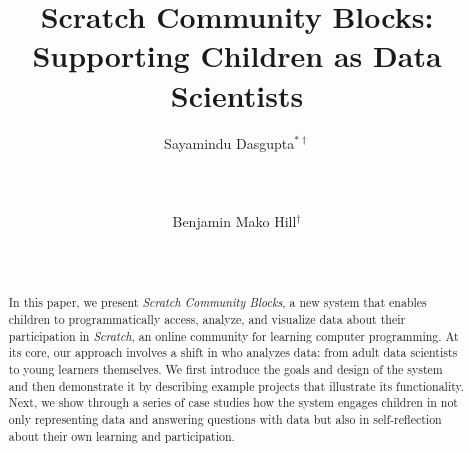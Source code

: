 \documentclass{sigchi}
\begin{document}
\title{Scratch Community Blocks:\\Supporting Children as Data Scientists}

\author{
  \alignauthor Sayamindu Dasgupta$^{* \dagger}$\\
    \\
    \\
    \\
  \alignauthor Benjamin Mako Hill$^{\dagger}$\\
    \\
    \\
}


\maketitle


\begin{abstract}
In this paper, we present \emph{Scratch Community Blocks}, a new system that enables children to programmatically access, analyze, and visualize data about their participation in \emph{Scratch}, an online community for learning computer programming. At its core, our approach involves a shift in who analyzes data: from adult data scientists to young learners themselves. We first introduce the goals and design of the system and then demonstrate it by describing example projects that illustrate its functionality. Next, we show through a series of case studies how the system engages children in not only representing data and answering questions with data but also in self-reflection about their own learning and participation.
\end{abstract}


\end{document}
